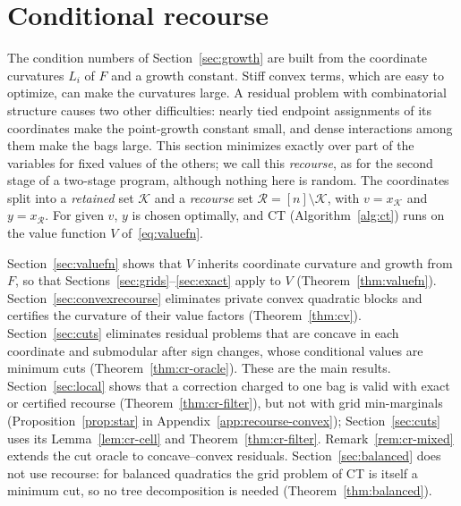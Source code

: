 \section{Conditional recourse}\label{sec:recourse}
The condition numbers of Section~\ref{sec:growth} are built from the
coordinate curvatures $L_i$ of $F$ and a growth constant. Stiff convex
terms, which are easy to optimize, can make the curvatures large. A residual
problem with combinatorial structure causes two other difficulties: nearly
tied endpoint assignments of its coordinates make the point-growth constant
small, and dense interactions among them make the bags large. This section
minimizes exactly over part of the variables for fixed values of the others;
we call
this \emph{recourse}, as for the second stage of a two-stage program,
although nothing here is random. The coordinates split into a
\emph{retained} set $\mathcal K$ and a \emph{recourse} set
$\mathcal R=[n]\setminus\mathcal K$, with $v=x_{\mathcal K}$ and
$y=x_{\mathcal R}$. For given $v$, $y$ is chosen optimally, and CT
(Algorithm~\ref{alg:ct}) runs on the value function $V$
of~\eqref{eq:valuefn}.

Section~\ref{sec:valuefn} shows that $V$ inherits coordinate curvature and
growth from $F$, so that Sections~\ref{sec:grids}--\ref{sec:exact} apply to
$V$ (Theorem~\ref{thm:valuefn}). Section~\ref{sec:convexrecourse} eliminates
private convex quadratic blocks and certifies the curvature of their value
factors (Theorem~\ref{thm:cv}). Section~\ref{sec:cuts} eliminates residual
problems that are concave in each coordinate and submodular after sign
changes, whose conditional values are minimum cuts
(Theorem~\ref{thm:cr-oracle}). These are the main results.
Section~\ref{sec:local} shows that a correction charged to one bag is valid
with exact or certified recourse (Theorem~\ref{thm:cr-filter}), but not with
grid min-marginals (Proposition~\ref{prop:star} in
Appendix~\ref{app:recourse-convex}); Section~\ref{sec:cuts} uses its
Lemma~\ref{lem:cr-cell} and Theorem~\ref{thm:cr-filter}.
Remark~\ref{rem:cr-mixed} extends the cut oracle to concave--convex
residuals. Section~\ref{sec:balanced} does not use recourse:
for balanced quadratics the grid problem of CT is itself a minimum cut, so
no tree decomposition is needed (Theorem~\ref{thm:balanced}).








